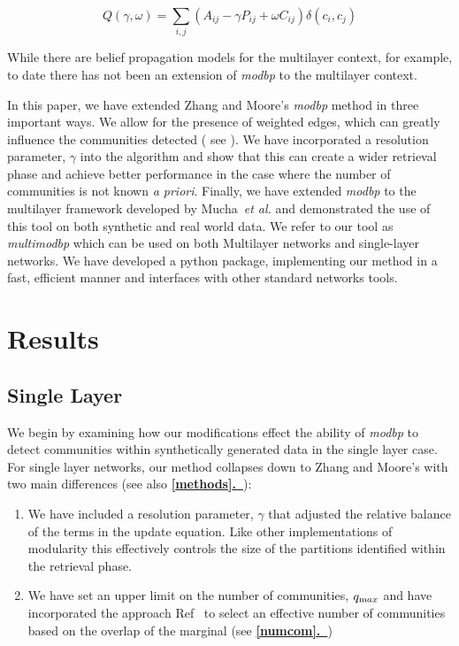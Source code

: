 \documentclass[11pt]{article}
\newcommand*{\fullref}[1]{\hyperref[{#1}]{ \textbf{\ref*{#1}.~\nameref*{#1}}}}
\newcommand{\whw}[1]{{\color{blue}{#1}}}
\begin{document}
\begin{equation}
Q(\gamma,\omega)=\sum_{i,j} \left( A_{ij} - \gamma P_{ij} + \omega C_{ij} \right)\delta(c_{i},c_{j})
\label{eq:multimod}
\end{equation}

While there are belief propagation models for the multilayer context, \cite{Ghasemian:2016hg} for example, to date there has not been an extension of \textit{modbp} to the multilayer context.  

In this paper, we have extended Zhang and Moore's \textit{modbp} method in three important ways.  We allow for the presence of weighted edges, which can greatly influence the communities detected ( see \whw{references needed} ).  We have incorporated a resolution parameter, $\gamma$ into the algorithm and show that this can create a wider retrieval phase and achieve better performance in the case where the number of communities is not known \textit{ a priori}.  Finally, we have extended \textit{modbp} to the multilayer framework developed by Mucha~\textit{et al.} \cite{Mucha:2010vk} and demonstrated the use of this tool on both synthetic and real world data.  We refer to our tool as \textit{multimodbp} which can be used on both Multilayer networks and single-layer networks.  We have developed a python package, implementing our method in a fast, efficient manner and interfaces with other standard networks tools. 




\section{Results}

\subsection{Single Layer}

We begin by examining how our modifications effect the ability of \textit{modbp} to detect communities within synthetically generated data in the single layer case.  For single layer networks, our method collapses down to Zhang and Moore's with two main differences (see also \fullref{methods}):   
\begin{enumerate}
\item We have included a resolution parameter, $\gamma$ that adjusted the relative balance of the terms in the update equation.  Like other implementations of modularity this effectively controls the size of the partitions identified within the retrieval phase.
\item We have set an upper limit on the number of communities, $q_{\text max }$ and have incorporated the approach Ref~\cite{Schulke:2015hq} to select an effective number of communities based on the overlap of the marginal (see \fullref{numcom})
\end{enumerate}
\end{document}
